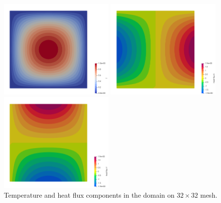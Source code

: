 \begin{center}
\includegraphics[width=5.7cm]{python_codes/fieldstone_173/results/exp2/T}
\includegraphics[width=5.7cm]{python_codes/fieldstone_173/results/exp2/qx}
\includegraphics[width=5.7cm]{python_codes/fieldstone_173/results/exp2/qy}\\
{\captionfont Temperature and heat flux components in the domain on $32 \times 32$ mesh.}
\end{center}



